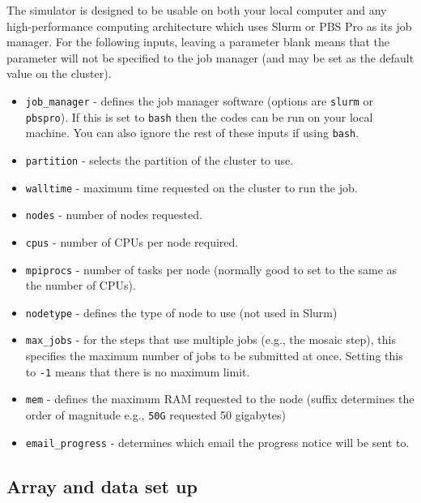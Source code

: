\documentclass[11pt]{report_jfr}
\begin{document}
The simulator is designed to be usable on both your local computer and any high-performance computing architecture which uses Slurm or PBS Pro as its job manager. For the following inputs, leaving a parameter blank means that the parameter will not be specified to the job manager (and may be set as the default value on the cluster).
%
\begin{itemize}
	\item \texttt{job\_manager} - defines the job manager software (options are \texttt{slurm} or \texttt{pbspro}). If this is set to \texttt{bash} then the codes can be run on your local machine. You can also ignore the rest of these inputs if using \texttt{bash}.
	\item \texttt{partition} - selects the partition of the cluster to use.
	\item \texttt{walltime} - maximum time requested on the cluster to run the job.
	\item \texttt{nodes} - number of nodes requested.
	\item \texttt{cpus} - number of CPUs per node required.
	\item \texttt{mpiprocs} - number of tasks per node (normally good to set to the same as the number of CPUs).
	\item \texttt{nodetype} - defines the type of node to use (not used in Slurm)
	\item \texttt{max\_jobs} - for the steps that use multiple jobs (e.g., the mosaic step), this specifies the maximum number of jobs to be submitted at once. Setting this to \texttt{-1} means that there is no maximum limit.
	\item \texttt{mem} - defines the maximum RAM requested to the node (suffix determines the order of magnitude e.g., \texttt{50G} requested 50 gigabytes)
	\item \texttt{email\_progress} - determines which email the progress notice will be sent to.
\end{itemize}

\subsection{Array and data set up}
\end{document}
